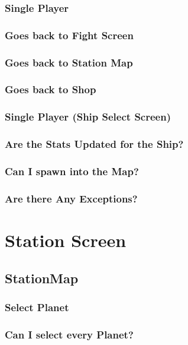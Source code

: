 \documentclass[11pt]{article}
\begin{document}
\subsubsection{Single Player}

\subsubsection{Goes back to Fight Screen}
\subsubsection{Goes back to Station Map}
\subsubsection{Goes back to Shop}


\subsubsection{Single Player (Ship Select Screen)}

\subsubsection{Are the Stats Updated for the Ship?}
\subsubsection{Can I spawn into the Map?}
\subsubsection{Are there Any Exceptions?}



\section{Station Screen}
\label{sec:orga891bce}

\subsection{StationMap}

\subsubsection{Select Planet}

\subsubsection{Can I select every Planet?}
\end{document}
